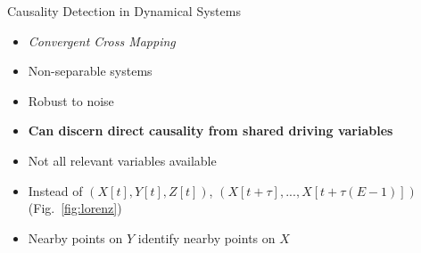 \documentclass[final]{beamer}
\begin{document}
\begin{frame}{}
\begin{textblock}{22}
\begin{block}{Causality Detection in Dynamical Systems}
\vspace{-1.5cm}
\begin{multicols}{2}
\footnotesize
\begin{itemize}
\item \text{ }\emph{Convergent Cross Mapping}
\item \text{ }Non-separable systems
\item \text{ }Robust to noise
\item \text{ }\textbf{Can discern direct causality from shared driving variables}
\end{itemize}
\columnbreak
\begin{itemize}
\item \text{ }Not all relevant variables available
\item \text{ }Instead of $(X[t], Y[t], Z[t])$, $(X[t+\tau], ..., X[t+\tau(E-1)])$ \cite{Takens81} (Fig.~\ref{fig:lorenz})
\item \text{ }Nearby points on $Y$ identify nearby points on $X$ \cite{Sugihara12}
\end{itemize}
\normalsize
\end{multicols}
\end{block}
\end{textblock}


\end{frame}
\end{document}
